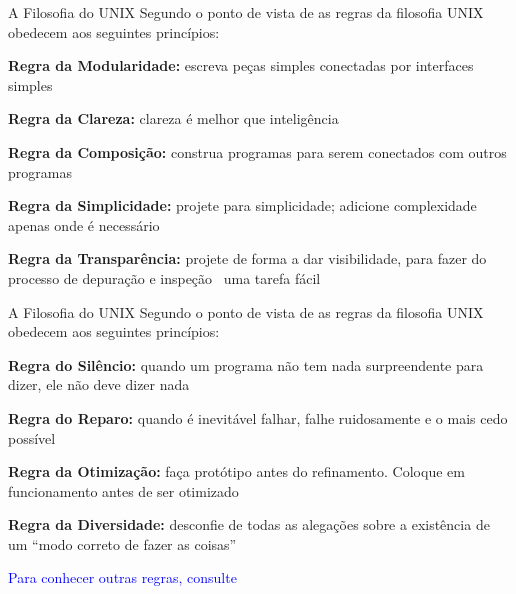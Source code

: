 \documentclass{beamer}
\begin{document}
   \begin{frame}[t]{A Filosofia do UNIX}
      Segundo o ponto de vista de \cite{RES2003} as regras da filosofia UNIX obedecem aos seguintes princípios: 
      \begin{itemize}
	\vspace{\baselineskip}
	{\item \textbf{Regra da Modularidade:}\uncover<3-> { escreva peças simples conectadas por interfaces simples}}
	{\item \textbf{Regra da Clareza:}\uncover<5-> { clareza é melhor que inteligência}}
	{\item \textbf{Regra da Composição:}\uncover<7-> { construa programas para serem conectados com outros programas}}
	{\item \textbf{Regra da Simplicidade:}\uncover<9-> { projete para simplicidade; adicione complexidade apenas onde é necessário}}
	{\item \textbf{Regra da Transparência:}\uncover<11-> { projete de forma a dar visibilidade, para fazer do processo de depuração e inspeção \ 
							     uma tarefa fácil}}
      \end{itemize}
   \end{frame}

    \begin{frame}[t]{A Filosofia do UNIX}
      Segundo o ponto de vista de \cite{RES2003} as regras da filosofia UNIX obedecem aos seguintes princípios: 
      \begin{itemize}
	\vspace{\baselineskip}
	{\item \textbf{Regra do Silêncio:}\uncover<3-> { quando um programa não tem nada surpreendente para dizer, ele não deve dizer nada}}
	\uncover<4->
	{\item \textbf{Regra do Reparo:}\uncover<5-> { quando é inevitável falhar, falhe ruidosamente e o mais cedo possível}}
	\uncover<6->
	{\item \textbf{Regra da Otimização:}\uncover<7-> { faça protótipo antes do refinamento. Coloque em funcionamento antes de ser otimizado}}
	\uncover<8->
	{\item \textbf{Regra da Diversidade:}\uncover<9-> { desconfie de todas as alegações sobre a existência de um ``modo correto de fazer as coisas''}}
      \end{itemize}
      \vspace{\baselineskip}
      {\textcolor{blue}{Para conhecer outras regras, consulte \cite{RES2003}}}
   \end{frame}
\end{document}
